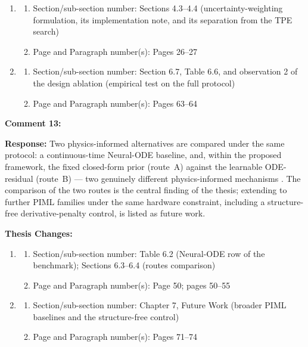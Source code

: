 \documentclass[12pt,a4paper]{article}
\begin{document}
\begin{enumerate}
    \item
    \begin{enumerate}
        \item Section/sub-section number: Sections 4.3--4.4 (uncertainty-weighting formulation, its implementation note, and its separation from the TPE search)
        \item Page and Paragraph number(s): Pages 26--27
    \end{enumerate}
    \item
    \begin{enumerate}
        \item Section/sub-section number: Section 6.7, Table 6.6, and observation 2 of the design ablation (empirical test on the full protocol)
        \item Page and Paragraph number(s): Pages 63--64
    \end{enumerate}
\end{enumerate}

\vspace{\baselineskip}

\textbf{Comment 13:} 

\vspace{\baselineskip}

\textbf{Response:} Two physics-informed alternatives are compared under the
same protocol: a continuous-time Neural-ODE baseline, and, within the proposed
framework, the fixed closed-form prior (route~A) against the learnable
ODE-residual (route~B) --- two genuinely different physics-informed mechanisms
\cite{raissi2019}. The comparison of the two routes is the central finding of
the thesis; extending to further PIML families under the same hardware
constraint, including a structure-free derivative-penalty control, is listed as
future work.

\vspace{\baselineskip}

\textbf{Thesis Changes:}

\begin{enumerate}
    \item
    \begin{enumerate}
        \item Section/sub-section number: Table 6.2 (Neural-ODE row of the benchmark); Sections 6.3--6.4 (routes comparison)
        \item Page and Paragraph number(s): Page 50; pages 50--55
    \end{enumerate}
    \item
    \begin{enumerate}
        \item Section/sub-section number: Chapter 7, Future Work (broader PIML baselines and the structure-free control)
        \item Page and Paragraph number(s): Pages 71--74
    \end{enumerate}
\end{enumerate}
\end{document}
